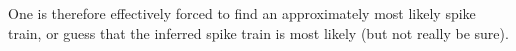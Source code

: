 One is therefore effectively forced to find an approximately most likely spike train, or guess that the inferred spike train is most likely (but not really be sure).  %
%

